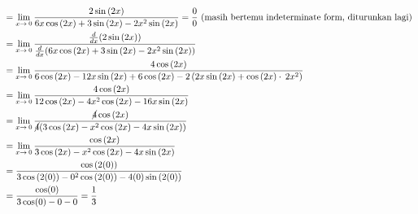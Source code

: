\documentclass[12pt]{article}
\begin{document}
\begin{fleqn}[2em]
\begin{align*}
{\begin{aligned}
  & = \lim _{x\to \:0} \frac{2\sin \left(2x\right)}{6x\cos \left(2x\right)+3\sin \left(2x\right)-2x^2\sin \left(2x\right)} = \frac{0}{0} \text{ (masih bertemu indeterminate form, diturunkan lagi)} \\
  & = \lim _{x\to \:0} \frac{\frac{d}{dx}(2\sin \left(2x\right))}{\frac{d}{dx}(6x\cos \left(2x\right)+3\sin \left(2x\right)-2x^2\sin \left(2x\right))} \\
  & = \lim _{x\to \:0} \frac{4\cos \left(2x\right)}{6\cos \left(2x\right)-12x\sin \left(2x\right)+6\cos \left(2x\right)-2\left(2x\sin \left(2x\right)+\cos \left(2x\right)\cdot \:2x^2\right)} \\
  & = \lim _{x\to \:0}\frac{4\cos \left(2x\right)}{12\cos \left(2x\right)-4x^2\cos \left(2x\right)-16x\sin \left(2x\right)} \\
  & = \lim _{x\to \:0}\frac{\cancel{4}\cos \left(2x\right)}{\cancel{4}(3\cos \left(2x\right)-x^2\cos \left(2x\right)-4x\sin \left(2x\right))} \\
  & = \lim _{x\to \:0}\frac{\cos \left(2x\right)}
    {3\cos \left(2x\right)-x^2\cos \left(2x\right)-4x\sin \left(2x\right)} \\
  & = \frac{\cos \left(2(0)\right)}
    {3\cos \left(2(0)\right)-0^2\cos \left(2(0)\right)-4(0)\sin \left(2(0)\right)} \\
  & = \frac{\cos(0)}{3\cos(0) - 0 - 0} = \frac{1}{3}
\end{aligned}
}
\end{align*}

\end{fleqn}
\end{document}
